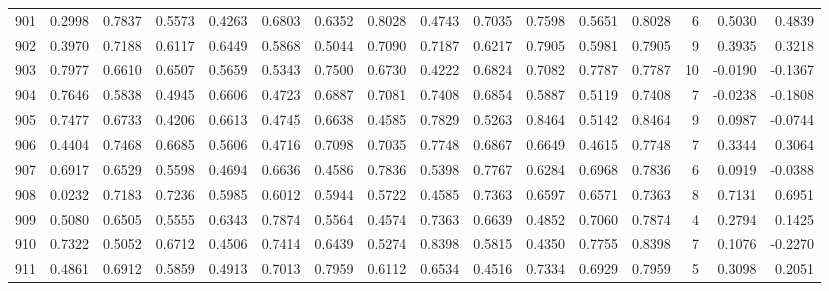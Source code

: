 \begin{tabular}{lrrrrrrrrrrrrrrr}
901 &      0.2998 &  0.7837 &  0.5573 &  0.4263 &  0.6803 &  0.6352 &  0.8028 &  0.4743 &  0.7035 &  0.7598 &   0.5651 &     0.8028 &      6 &                    0.5030 &                     0.4839 \\
902 &      0.3970 &  0.7188 &  0.6117 &  0.6449 &  0.5868 &  0.5044 &  0.7090 &  0.7187 &  0.6217 &  0.7905 &   0.5981 &     0.7905 &      9 &                    0.3935 &                     0.3218 \\
903 &      0.7977 &  0.6610 &  0.6507 &  0.5659 &  0.5343 &  0.7500 &  0.6730 &  0.4222 &  0.6824 &  0.7082 &   0.7787 &     0.7787 &     10 &                   -0.0190 &                    -0.1367 \\
904 &      0.7646 &  0.5838 &  0.4945 &  0.6606 &  0.4723 &  0.6887 &  0.7081 &  0.7408 &  0.6854 &  0.5887 &   0.5119 &     0.7408 &      7 &                   -0.0238 &                    -0.1808 \\
905 &      0.7477 &  0.6733 &  0.4206 &  0.6613 &  0.4745 &  0.6638 &  0.4585 &  0.7829 &  0.5263 &  0.8464 &   0.5142 &     0.8464 &      9 &                    0.0987 &                    -0.0744 \\
906 &      0.4404 &  0.7468 &  0.6685 &  0.5606 &  0.4716 &  0.7098 &  0.7035 &  0.7748 &  0.6867 &  0.6649 &   0.4615 &     0.7748 &      7 &                    0.3344 &                     0.3064 \\
907 &      0.6917 &  0.6529 &  0.5598 &  0.4694 &  0.6636 &  0.4586 &  0.7836 &  0.5398 &  0.7767 &  0.6284 &   0.6968 &     0.7836 &      6 &                    0.0919 &                    -0.0388 \\
908 &      0.0232 &  0.7183 &  0.7236 &  0.5985 &  0.6012 &  0.5944 &  0.5722 &  0.4585 &  0.7363 &  0.6597 &   0.6571 &     0.7363 &      8 &                    0.7131 &                     0.6951 \\
909 &      0.5080 &  0.6505 &  0.5555 &  0.6343 &  0.7874 &  0.5564 &  0.4574 &  0.7363 &  0.6639 &  0.4852 &   0.7060 &     0.7874 &      4 &                    0.2794 &                     0.1425 \\
910 &      0.7322 &  0.5052 &  0.6712 &  0.4506 &  0.7414 &  0.6439 &  0.5274 &  0.8398 &  0.5815 &  0.4350 &   0.7755 &     0.8398 &      7 &                    0.1076 &                    -0.2270 \\
911 &      0.4861 &  0.6912 &  0.5859 &  0.4913 &  0.7013 &  0.7959 &  0.6112 &  0.6534 &  0.4516 &  0.7334 &   0.6929 &     0.7959 &      5 &                    0.3098 &                     0.2051 \\

\end{tabular}
